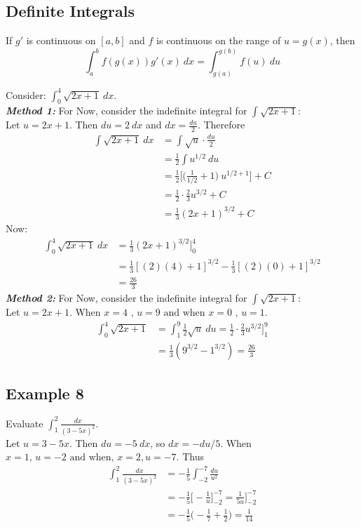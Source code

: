 \documentclass[11pt]{article}
\begin{document}
\pagebreak
\subsection{Definite Integrals}
\begin{theo}
    If $ g' $ is continuous on $ [a,b] $ and $ f $ is continuous on the range of $ u=g(x) $, then \[
        \int_{a}^{b}f(g(x))g'(x)\ dx = \int_{g(a)}^{g(b)}f(u)\ du
    \]
\end{theo}
Consider: $ \displaystyle{\int_{0}^{4}\sqrt{2x+1}\ dx} $.\\
\textbf{\textit{Method 1: }}For Now, consider the indefinite integral for $ \displaystyle{\int \sqrt{2x+1}} $:
\\[8pt]
Let $ u = 2x+1 $. Then $ du = 2\ dx $ and $ dx = \frac{du}{2} $. Therefore
\begin{align*}
    \int \sqrt{2x+1}\ dx
    &= \int \sqrt{u} \cdot \frac{du}{2}\\
    &= \frac{1}{2}\int u^{1/2}\ du\\
    &= \frac{1}{2}\Big[ \Big(\frac{1}{1/2} + 1\Big)\ u^{1/2 + 1} \Big] + C\\
    &= \frac{1}{2} \cdot \frac{2}{3}u^{3/2} + C\\
    &= \frac{1}{3}(2x+1)^{3/2} + C
\end{align*}
Now:
\begin{align*}
    \int_{0}^{4}\sqrt{2x+1}\ dx
    &= \frac{1}{3}(2x+1)^{3/2} \bigg]_0^4\\
    &= \frac{1}{3}[(2)(4)+1]^{3/2} - \frac{1}{3}[(2)(0)+1]^{3/2}\\
    &= \frac{26}{3}
\end{align*}
\textbf{\textit{Method 2: }} For Now, consider the indefinite integral for $ \displaystyle{\int \sqrt{2x+1}} $:
\\[8pt]
Let $ u=2x+1 $. When $ x=4\text{ , } u=9 \text{ and when } x=0\text{ , } u = 1 $.
\begin{align*}
    \int_{0}^{4}\sqrt{2x+1}
    &= \int_{1}^{9}\frac{1}{2}\sqrt{u}\ du
    =  \frac{1}{2} \cdot \frac{2}{3}u^{3/2} \bigg]_1^9\\
    &= \frac{1}{3}(9^{3/2} - 1^{3/2}) = \frac{26}{3}
\end{align*}

\subsection{Example 8}
Evaluate $ \displaystyle{\int_{1}^{2}\frac{dx}{(3-5x)^2}} $.
\\[8pt]
Let $ u=3-5x $. Then $ du = -5\ dx $, so $ dx = -du/5 $. When $ x = 1 \text{, } u = -2 \text{ and when, } x=2, u=-7 $. Thus
\begin{align*}
    \int_{1}^{2}\frac{dx}{(3-5x)^2}
    &= -\frac{1}{5}\int_{-2}^{-7}\frac{du}{u^2}\\
    &= -\frac{1}{5}\bigg[ -\frac{1}{u}\bigg]_{-2}^{-7} = \frac{1}{5u}\bigg]_{-2}^{-7}\\
    &= -\frac{1}{5}\bigg(-\frac{1}{7}+\frac{1}{2}\bigg) = \frac{1}{14}
\end{align*}
\end{document}
